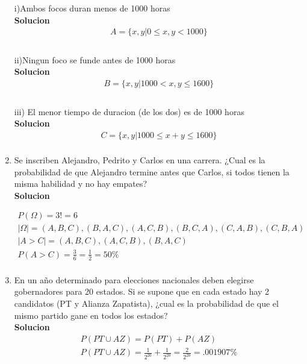 \begin{enumerate}
    i)Ambos focos duran menos de 1000 horas     \\
    \textbf{Solucion}\\
    \begin{gather*}
    A = \lbrace x,y | 0\leq x,y <1000\rbrace \\
    \end{gather*}\\
    ii)Ningun foco se funde antes de 1000 horas 
    \\\textbf{Solucion}\\
    \begin{gather*}
    B = \lbrace x,y | 1000 < x,y \leq 1600\rbrace \\
    \end{gather*}\\
    iii) El menor tiempo de duracion (de los dos) es de 1000 horas
    \\\textbf{Solucion}\\
    \begin{gather*}
    C = \lbrace x,y | 1000 \leq x+y \leq 1600\rbrace \\
    \end{gather*}
    
    \item Se inscriben Alejandro, Pedrito y Carlos en una carrera. ¿Cual es la probabilidad de que Alejandro termine antes que Carlos, si todos tienen la misma habilidad y no hay empates? 
    \\\textbf{Solucion}
    
    \begin{gather*}
    P(\Omega) = 3! = 6\\
    |\Omega| = {(A,B,C), (B,A,C), (A,C,B), (B,C,A), (C,A,B), (C,B,A)}\\
    |A>C| = {(A,B,C), (A,C,B), (B,A,C)}\\
    P(A>C) = \frac{3}{6} =  \frac{1}{2} = 50\% \\        
    \end{gather*}
    
    \item En un año determinado para elecciones nacionales deben elegirse gobernadores para 20 estados. Si se supone que en cada estado hay 2 candidatos (PT y Alianza Zapatista), ¿cual es la probabilidad de que el mismo partido gane en todos los estados?
    \\\textbf{Solucion}\\
    \begin{gather*}
    P(PT \cup AZ)= P(PT) + P(AZ)\\
    P(PT \cup AZ)= \frac{1}{2^{20}} + \frac{1}{2^{20}} = \frac{2}{2^{20}} = .001907\%\\
    \end{gather*}
    

\end{enumerate}
